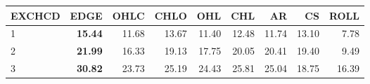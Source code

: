 \begin{table}[ht]
\centering
\begin{tabular}{lrrrrrrrr}
  \hline
EXCHCD & EDGE & OHLC & CHLO & OHL & CHL & AR & CS & ROLL \\ 
  \hline
1 & \textbf{15.44} & 11.68 & 13.67 & 11.40 & 12.48 & 11.74 & 13.10 & 7.78 \\ 
  2 & \textbf{21.99} & 16.33 & 19.13 & 17.75 & 20.05 & 20.41 & 19.40 & 9.49 \\ 
  3 & \textbf{30.82} & 23.73 & 25.19 & 24.43 & 25.81 & 25.04 & 18.75 & 16.39 \\ 
   \hline
\end{tabular}
\end{table}
